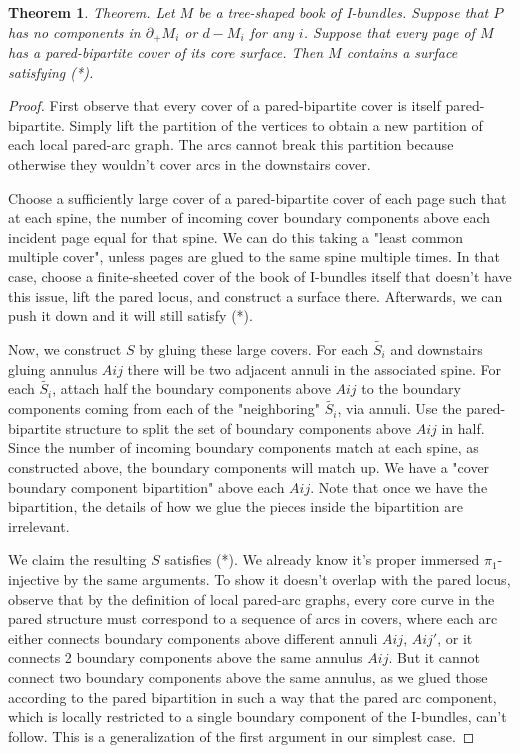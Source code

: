 \documentclass[12pt]{amsart}
\newtheorem{thm}[theorem]{Theorem}
\theoremstyle{definition}
\newcommand{\bd}{\partial}
\begin{document}
\begin{thm}

Theorem. Let $M$ be a tree-shaped book of I-bundles. Suppose that $P$ has no
components in $\bd_+M_i$ or $d-M_i$ for any $i$. Suppose that every page of $M$ has
a pared-bipartite cover of its core surface. Then $M$ contains a surface
satisfying (*).

\end{thm}
\begin{proof}

First observe that every cover of a pared-bipartite cover is itself
pared-bipartite. Simply lift the partition of the vertices to obtain a new
partition of each local pared-arc graph. The arcs cannot break this
partition because otherwise they wouldn't cover arcs in the downstairs cover.

Choose a sufficiently large cover of a pared-bipartite cover of each page such
that at each spine, the number of incoming cover boundary components above each
incident page equal for that spine. We can do this taking a "least common
multiple cover", unless pages are glued to the same spine multiple times. In
that case, choose a finite-sheeted cover of the book of I-bundles itself that
doesn't have this issue, lift the pared locus, and construct a surface there.
Afterwards, we can push it down and it will still satisfy (*).

Now, we construct $S$ by gluing these large covers. For each $\widetilde{S_i}$ and
downstairs gluing annulus $Aij$ there will be two adjacent annuli in the
associated spine. For each $\widetilde{S_i}$, attach half the boundary components above
$Aij$ to the boundary components coming from each of the "neighboring"
$\widetilde{S_i}$,
via annuli. Use the pared-bipartite structure to split the set of boundary
components above $Aij$ in half. Since the number of incoming boundary components
match at each spine, as constructed above, the boundary components will match
up. We have a "cover boundary component bipartition" above each $Aij$. Note that
once we have the bipartition, the details of how we glue the pieces inside the
bipartition are irrelevant.

We claim the resulting $S$ satisfies (*). We already know it's proper immersed
$\pi_1$-injective by the same arguments. To show it doesn't overlap with the pared
locus, observe that by the definition of local pared-arc graphs, every core
curve in the pared structure must correspond to a sequence of arcs in covers,
where each arc either connects boundary components above different annuli $Aij$,
$Aij'$, or it connects 2 boundary components above the same annulus $Aij$. But it
cannot connect two boundary components above the same annulus, as we glued
those according to the pared bipartition in such a way that the pared arc
component, which is locally restricted to a single boundary component of the
I-bundles, can't follow. This is a generalization of the first argument in our
simplest case.


\end{proof}
\end{document}
